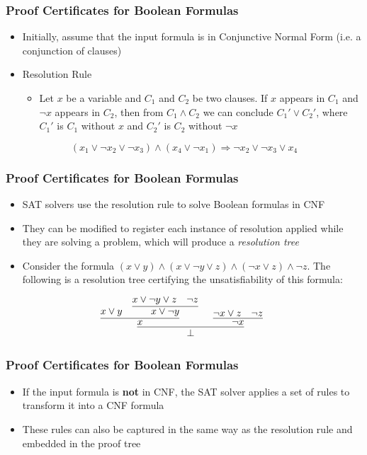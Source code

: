 \documentclass[usepdftitle=false,aspectratio=169,usenames,dvipsnames]{beamer}
\newcommand\vitem{\vfill\item}
\begin{document}
\begin{frame}
  \frametitle{Proof Certificates for Boolean Formulas}
    \begin{itemize}
    \item Initially, assume that the input formula is in Conjunctive Normal Form (i.e. a conjunction of clauses)
    \vitem Resolution Rule
    \begin{itemize}
      \item Let $x$ be a variable and $C_{1}$ and $C_{2}$ be two clauses. If $x$ appears in $C_{1}$ and $\neg x$ appears in $C_{2}$, then from $C_{1} \wedge C_{2}$ we can conclude $C_{1}' \vee C_{2}'$, where $C_{1}'$ is $C_{1}$ without $x$ and $C_{2}'$ is $C_{2}$ without $\neg x$
    \end{itemize}
  \end{itemize}
          \vfill
          $$ (x_{1} \vee \neg x_{2} \vee \neg x_{3}) \wedge (x_{4} \vee \neg x_{1}) \Rightarrow \neg x_{2} \vee \neg x_{3} \vee x_{4} $$
\end{frame}

\begin{frame}
  \frametitle{Proof Certificates for Boolean Formulas}
  \begin{itemize}
    \item SAT solvers use the resolution rule to solve Boolean formulas in CNF
    \vitem They can be modified to register each instance of resolution applied while they are solving a problem, which will produce a \textit{resolution tree}
    \vitem Consider the formula $(x \vee y) \wedge (x \vee \neg y \vee z) \wedge (\neg x \vee z) \wedge  \neg z$. The following is a resolution tree certifying the unsatisfiability of this formula:
  \end{itemize}
  \vfill
  \[
\infer[]{\bot}{
  \infer[]
  {x}
  {x \vee y & \infer[]{x \vee \neg y}{x \vee \neg y \vee z & \neg z}} & \infer[]{\neg x}{\neg x \vee z & \neg z}}
\]
\end{frame}

\begin{frame}
  \frametitle{Proof Certificates for Boolean Formulas}
  \begin{itemize}
    \item If the input formula is \textbf{not} in CNF, the SAT solver applies a set of rules to transform it into a CNF formula
    \vitem These rules can also be captured in the same way as the resolution rule and embedded in the proof tree
  \end{itemize}
\end{frame}
\end{document}
